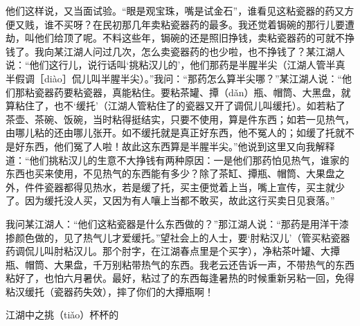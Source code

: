 \documentclass[12pt,UTF8]{ctexbook}
\begin{document}
他们这样说，又当面试验。“眼是观宝珠，嘴是试金石”，谁看见这粘瓷器的药又方便又贱，谁不买呀？在民初那几年卖粘瓷器药的最多。我还觉着锔碗的那行儿要遭劫，叫他们给顶了呢。不料这些年，锔碗的还是照旧挣钱，卖粘瓷器药的可就不挣钱了。我向某江湖人问过几次，怎么卖瓷器药的也少啦，也不挣钱了？某江湖人说：“他们这行儿，说行话叫‘挑粘汉儿的’，他们那药是半腥半尖（江湖人管半真半假调［diào］侃儿叫半腥半尖）。”我问：“那药怎么算半尖哪？”某江湖人说：“他们那粘瓷器药要粘瓷器，真能粘住。要粘茶罐、撢（dǎn）瓶、帽筒、大黑盘，就算粘住了，也不‘缓托’（江湖人管粘住了的瓷器又开了调侃儿叫缓托）。如若粘了茶壶、茶碗、饭碗，当时粘得挺结实，只要不使用，算是件东西；如若一见热气，由哪儿粘的还由哪儿张开。如不缓托就是真正好东西，他不冤人的；如缓了托就不是好东西，他们冤了人啦！故此这东西算是半腥半尖。”他说到这里又向我解释道：“他们挑粘汉儿的生意不大挣钱有两种原因：一是他们那药怕见热气，谁家的东西也买来使用，不见热气的东西能有多少？除了茶缸、撢瓶、帽筒、大果盘之外，件件瓷器都得见热水，若是缓了托，买主便觉着上当，嘴上宣传，买主就少了。因为缓托没人买，又因为有人嚷上当都不敢买，故此这行买卖日见衰落。”

我问某江湖人：“他们这粘瓷器是什么东西做的？”那江湖人说：“那药是用洋干漆掺颜色做的，见了热气儿才爱缓托。”望社会上的人士，要‘肘粘汉儿’（管买粘瓷器药调侃儿叫肘粘汉儿。那个肘字，在江湖春点里是个买字），净粘茶叶罐、大撢瓶、帽筒、大果盘，千万别粘带热气的东西。我老云还告诉一声，不带热气的东西粘好了，也怕六月暑伏。最好，粘过了的东西每逢暑热的时候重新另粘一回，免得粘汉缓托（瓷器药失效），摔了你们的大撢瓶啊！





江湖中之挑（tiǎo）杯杯的
\end{document}
